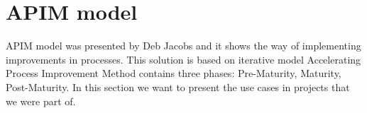 \section{APIM model}


APIM model was presented by Deb Jacobs and it shows the way of implementing improvements in processes. This solution is based on iterative model \cite{jacobs}
Accelerating Process Improvement Method contains three phases: Pre-Maturity, Maturity, Post-Maturity. In this section we want to present the use cases in projects that we were part of.
